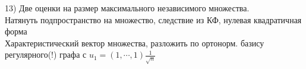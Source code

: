 13) Две оценки на размер максимального независимого множества.\\    
Натянуть подпространство на  множество, следствие из КФ, нулевая квадратичная форма\\
Характеристический вектор множества, разложить по ортонорм. базису регулярного(!) графа с $u_1 = (1,\cdots,1) \frac{1}{\sqrt n}$\\

